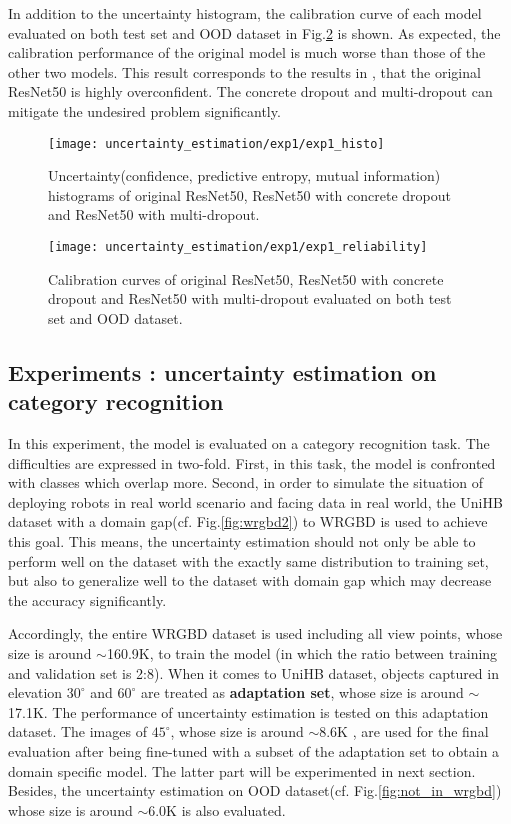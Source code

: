 In addition to the uncertainty histogram, the calibration curve of each model evaluated on both test set and OOD dataset in Fig.\ref{exp1_reliability} is shown.
As expected, the calibration performance of the original model is much worse than those of the other two models.
This result corresponds to the results in \cite{guo2017calibration}, that the original ResNet50 is highly overconfident.
The concrete dropout and multi-dropout can mitigate the undesired problem significantly.

\begin{figure}[H]
	\begin{center}
		\texttt{[image: uncertainty\_estimation/exp1/exp1\_histo]}
		\caption{Uncertainty(confidence, predictive entropy, mutual information) histograms of original ResNet50, ResNet50 with concrete dropout and ResNet50 with multi-dropout.}		
		\label{exp1_histo}
	\end{center}
\end{figure}
\begin{figure}[H]
	\begin{center}
		\texttt{[image: uncertainty\_estimation/exp1/exp1\_reliability]}
		\caption{Calibration curves of original ResNet50, ResNet50 with concrete dropout and ResNet50 with multi-dropout evaluated on both test set and \gls{OOD} dataset.}		
		\label{exp1_reliability}
	\end{center}
\end{figure}

\subsection{Experiments : uncertainty estimation on category recognition}
In this experiment, the model is evaluated on a category recognition task.
The difficulties are expressed in two-fold.
First, in this task, the model is confronted with classes which overlap more.
Second, in order to simulate the situation of deploying robots in real world scenario and facing data in real world, the UniHB dataset with a domain gap(cf. Fig.\ref{fig:wrgbd2}) to WRGBD is used to achieve this goal.
This means, the uncertainty estimation should not only be able to perform well on the dataset with the exactly same distribution to training set, but also to generalize well to the dataset with domain gap which may decrease the accuracy significantly.

Accordingly, the entire WRGBD dataset is used including all view points, whose size is around $\sim$160.9K, to train the model (in which the ratio between training and validation set is 2:8). When it comes to UniHB dataset, objects captured in elevation $30^\circ$ and $60^\circ$ are treated as \textbf{adaptation set}, whose size is around $\sim$17.1K.
The performance of uncertainty estimation is tested on this adaptation dataset.
The images of $45^\circ$, whose size is around $\sim$8.6K , are used for the final evaluation after being fine-tuned with a subset of the adaptation set to obtain a domain specific model.
The latter part will be experimented in next section.
Besides, the uncertainty estimation on OOD dataset(cf. Fig.\ref{fig:not_in_wrgbd}) whose size is around $\sim$6.0K is also evaluated. 


